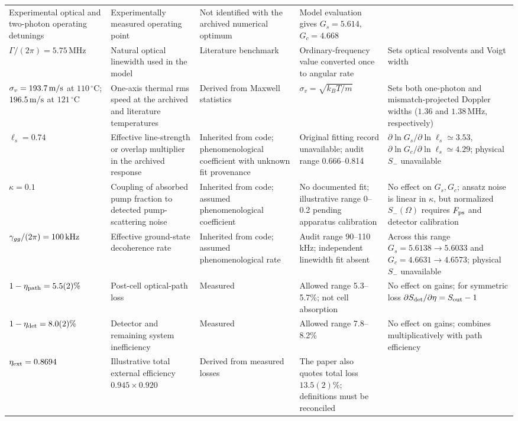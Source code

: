 \documentclass[11pt,a4paper]{article}
\newcommand{\MHz}{\,\mathrm{MHz}}
\newcommand{\degC}{\,^{\circ}\mathrm C}
\begin{document}
\begin{longtable}{L{2.8cm}L{3.4cm}L{2.5cm}L{3.4cm}L{3.4cm}}
Experimental optical and two-photon operating detunings &
Experimentally measured operating point \cite{Sim2025} &
Not identified with the archived numerical optimum &
Model evaluation gives $G_s=5.614$, $G_c=4.668$\\
$\Gamma/(2\pi)=5.75\MHz$ &
Natural optical linewidth used in the model &
Literature benchmark &
Ordinary-frequency value converted once to angular rate &
Sets optical resolvents and Voigt width\\
$\sigma_v=193.7\,{\rm m/s}$ at $110\degC$;
$196.5\,{\rm m/s}$ at $121\degC$ &
One-axis thermal rms speed at the archived and literature temperatures &
Derived from Maxwell statistics &
$\sigma_v=\sqrt{k_BT/m}$ &
Sets both one-photon and mismatch-projected Doppler widths
($1.36$ and $1.38\MHz$, respectively)\\
$\ell_s=0.74$ &
Effective line-strength or overlap multiplier in the archived response &
Inherited from code; phenomenological coefficient with unknown fit provenance &
Original fitting record unavailable; audit range 0.666--0.814 &
$\partial\ln G_s/\partial\ln\ell_s\simeq3.53$,
$\partial\ln G_c/\partial\ln\ell_s\simeq4.29$;
physical $S_-$ unavailable\\
$\kappa=0.1$ &
Coupling of absorbed pump fraction to detected pump-scattering noise &
Inherited from code; assumed phenomenological coefficient &
No documented fit; illustrative range 0--0.2 pending apparatus calibration &
No effect on $G_s,G_c$; ansatz noise is linear in $\kappa$, but normalized
$S_-(\Omega)$ requires $F_{\rm ps}$ and detector calibration\\
$\gamma_{gg}/(2\pi)=100\,{\rm kHz}$ &
Effective ground-state decoherence rate &
Inherited from code; assumed phenomenological rate &
Audit range 90--110 kHz; independent linewidth fit absent &
Across this range $G_s=5.6138\to5.6033$ and
$G_c=4.6631\to4.6573$; physical $S_-$ unavailable\\
$1-\eta_{\rm path}=5.5(2)\%$ &
Post-cell optical-path loss &
Measured \cite{Sim2025} &
Allowed range 5.3--5.7\%; not cell absorption &
No effect on gains; for symmetric loss
$\partial S_{\rm det}/\partial\eta=S_{\rm out}-1$\\
$1-\eta_{\rm det}=8.0(2)\%$ &
Detector and remaining system inefficiency &
Measured \cite{Sim2025} &
Allowed range 7.8--8.2\% &
No effect on gains; combines multiplicatively with path efficiency\\
$\eta_{\rm ext}=0.8694$ &
Illustrative total external efficiency
$0.945\times0.920$ &
Derived from measured losses &
The paper also quotes total loss $13.5(2)\%$; definitions must be reconciled &

\end{longtable}
\end{document}
